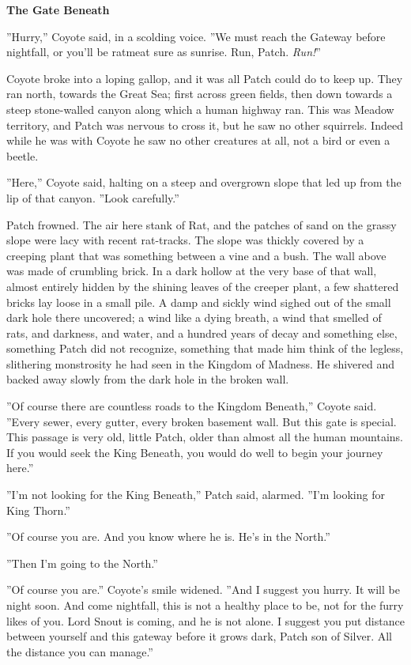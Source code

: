 \documentclass[11pt]{article}
\begin{document}
\par
{\bf The Gate Beneath\par
}\par
 ''Hurry,'' Coyote said, in a scolding voice. ''We must reach the Gateway before nightfall, or you'll be ratmeat sure as sunrise. Run, Patch. {\it Run!}''\par
 Coyote broke into a loping gallop, and it was all Patch could do to keep up. They ran north, towards the Great Sea; first across green fields, then down towards a steep stone-walled canyon along which a human highway ran. This was Meadow territory, and Patch was nervous to cross it, but he saw no other squirrels. Indeed while he was with Coyote he saw no other creatures at all, not a bird or even a beetle.\par
 ''Here,'' Coyote said, halting on a steep and overgrown slope that led up from the lip of that canyon. ''Look carefully.''\par
 Patch frowned. The air here stank of Rat, and the patches of sand on the grassy slope were lacy with recent rat-tracks. The slope was thickly covered by a creeping plant that was something between a vine and a bush. The wall above was made of crumbling brick. In a dark hollow at the very base of that wall, almost entirely hidden by the shining leaves of the creeper plant, a few shattered bricks lay loose in a small pile. A damp and sickly wind sighed out of the small dark hole there uncovered; a wind like a dying breath, a wind that smelled of rats, and darkness, and water, and a hundred years of decay %
 and something else, something Patch did not recognize, something that made him think of the legless, slithering monstrosity he had seen in the Kingdom of Madness. He shivered and backed away slowly from the dark hole in the broken wall.\par
 ''Of course there are countless roads to the Kingdom Beneath,'' Coyote said. ''Every sewer, every gutter, every broken basement wall. But this gate is special. This passage is very old, little Patch, older than almost all the human mountains. If you would seek the King Beneath, you would do well to begin your journey here.''\par
 ''I'm not looking for the King Beneath,'' Patch said, alarmed. ''I'm looking for King Thorn.''\par
 ''Of course you are. And you know where he is. He's in the North.''\par
 ''Then I'm going to the North.''\par
 ''Of course you are.'' Coyote's smile widened. ''And I suggest you hurry. It will be night soon. And come nightfall, this is not a healthy place to be, not for the furry likes of you. Lord Snout is coming, and he is not alone. I suggest you put distance between yourself and this gateway before it grows dark, Patch son of Silver. All the distance you can manage.''\par
\end{document}
